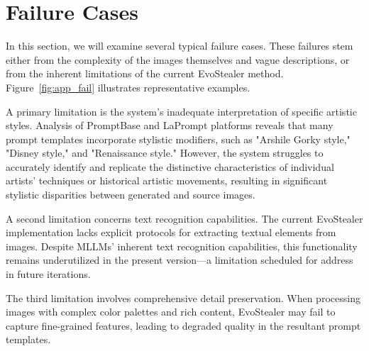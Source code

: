 \section{Failure Cases} \label{app_failcases}

In this section, we will examine several typical failure cases. These failures stem either from the complexity of the images themselves and vague descriptions, or from the inherent limitations of the current EvoStealer method. Figure~\ref{fig:app_fail} illustrates representative examples.

A primary limitation is the system's inadequate interpretation of specific artistic styles. Analysis of PromptBase and LaPrompt platforms reveals that many prompt templates incorporate stylistic modifiers, such as "Arshile Gorky style," "Disney style," and "Renaissance style." However, the system struggles to accurately identify and replicate the distinctive characteristics of individual artists' techniques or historical artistic movements, resulting in significant stylistic disparities between generated and source images.

A second limitation concerns text recognition capabilities. The current EvoStealer implementation lacks explicit protocols for extracting textual elements from images. Despite MLLMs' inherent text recognition capabilities, this functionality remains underutilized in the present version—a limitation scheduled for address in future iterations.

The third limitation involves comprehensive detail preservation. When processing images with complex color palettes and rich content, EvoStealer may fail to capture fine-grained features, leading to degraded quality in the resultant prompt templates.






